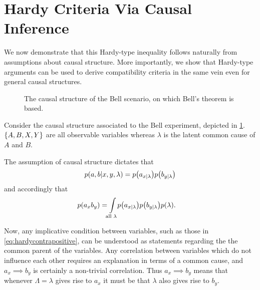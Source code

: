 \section{Hardy Criteria Via Causal Inference}

We now demonstrate that this Hardy-type inequality follows naturally from assumptions about causal structure. More importantly, we show that Hardy-type arguments can be used to derive compatibility criteria in the same vein even for general causal structures.

\begin{figure}[t!]
\caption{The causal structure of the Bell scenario, on which Bell's theorem is based.}
 \label{fig:BellDAG}
\end{figure}

Consider the causal structure associated to the Bell experiment, depicted in \cref{fig:BellDAG}. $\left\lbrace A,B,X,Y\right\rbrace$ are all observable variables whereas $\lambda$ is the latent common cause of $A$ and $B$.

The assumption of causal structure dictates that
\begin{align}\begin{split}\label{eq:bellstructure}
\p{a,b|x,y,\lambda}=\p{a_{x|\lambda}}\p{b_{y|\lambda}}
\end{split}\end{align}
and accordingly that
\begin{align}\begin{split}\label{eq:bellintegration}
&\p{a_x b_y}
=\int\limits_{\mathclap{\text{all }\lambda}}\p{a_{x|\lambda}}\p{b_{y|\lambda}}\p{\lambda}.
\end{split}\end{align}



Now, any implicative condition between variables, such as those in \cref{eq:hardycontrapositive},  can be understood as statements regarding the the common parent of the variables. Any correlation between variables which do not influence each other requires an explanation in terms of a common cause, and $a_x {\scriptstyle \implies} b_y$ is certainly a non-trivial correlation. Thus $a_x {\scriptstyle \implies} b_y$ means that whenever $\Lambda=\lambda$ gives rise to $a_x$ it must be that $\lambda$ also gives rise to $b_y$. 

